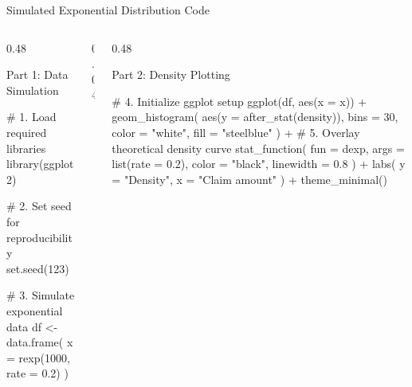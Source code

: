 \documentclass[
  ignorenonframetext,
  aspectratio=169,
]{beamer}
\newenvironment{Shaded}{\begin{snugshade}}{\end{snugshade}}
\newcommand{\AttributeTok}[1]{\textcolor[rgb]{0.40,0.45,0.13}{#1}}
\newcommand{\CommentTok}[1]{\textcolor[rgb]{0.37,0.37,0.37}{#1}}
\newcommand{\DecValTok}[1]{\textcolor[rgb]{0.68,0.00,0.00}{#1}}
\newcommand{\FloatTok}[1]{\textcolor[rgb]{0.68,0.00,0.00}{#1}}
\newcommand{\FunctionTok}[1]{\textcolor[rgb]{0.28,0.35,0.67}{#1}}
\newcommand{\NormalTok}[1]{\textcolor[rgb]{0.00,0.23,0.31}{#1}}
\newcommand{\OtherTok}[1]{\textcolor[rgb]{0.00,0.23,0.31}{#1}}
\newcommand{\SpecialCharTok}[1]{\textcolor[rgb]{0.37,0.37,0.37}{#1}}
\newcommand{\StringTok}[1]{\textcolor[rgb]{0.13,0.47,0.30}{#1}}
\begin{document}
\begin{frame}[fragile]{Simulated Exponential Distribution Code}
\protect{}\label{simulated-exponential-distribution-code}
\begin{columns}[T]
\begin{column}{0.48\linewidth}
\begin{block}{Part 1: Data Simulation}
\protect{}\label{part-1-data-simulation}
\begin{Shaded}
\begin{Highlighting}[]
\CommentTok{\# 1. Load required libraries}
\FunctionTok{library}\NormalTok{(ggplot2)}

\CommentTok{\# 2. Set seed for reproducibility}
\FunctionTok{set.seed}\NormalTok{(}\DecValTok{123}\NormalTok{)}

\CommentTok{\# 3. Simulate exponential data}
\NormalTok{df }\OtherTok{\textless{}{-}} \FunctionTok{data.frame}\NormalTok{(}
  \AttributeTok{x =} \FunctionTok{rexp}\NormalTok{(}\DecValTok{1000}\NormalTok{, }\AttributeTok{rate =} \FloatTok{0.2}\NormalTok{)}
\NormalTok{)}
\end{Highlighting}
\end{Shaded}
\end{block}
\end{column}

\begin{column}{0.04\linewidth}
\end{column}

\begin{column}{0.48\linewidth}
\begin{block}{Part 2: Density Plotting}
\protect{}\label{part-2-density-plotting}
\begin{Shaded}
\begin{Highlighting}[]
\CommentTok{\# 4. Initialize ggplot setup}
\FunctionTok{ggplot}\NormalTok{(df, }\FunctionTok{aes}\NormalTok{(}\AttributeTok{x =}\NormalTok{ x)) }\SpecialCharTok{+}
  \FunctionTok{geom\_histogram}\NormalTok{(}
    \FunctionTok{aes}\NormalTok{(}\AttributeTok{y =} \FunctionTok{after\_stat}\NormalTok{(density)), }
    \AttributeTok{bins =} \DecValTok{30}\NormalTok{, }
    \AttributeTok{color =} \StringTok{"white"}\NormalTok{, }
    \AttributeTok{fill =} \StringTok{"steelblue"}
\NormalTok{  ) }\SpecialCharTok{+}
  \CommentTok{\# 5. Overlay theoretical density curve}
  \FunctionTok{stat\_function}\NormalTok{(}
    \AttributeTok{fun =}\NormalTok{ dexp, }
    \AttributeTok{args =} \FunctionTok{list}\NormalTok{(}\AttributeTok{rate =} \FloatTok{0.2}\NormalTok{), }
    \AttributeTok{color =} \StringTok{"black"}\NormalTok{, }
    \AttributeTok{linewidth =} \FloatTok{0.8}
\NormalTok{  ) }\SpecialCharTok{+}
  \FunctionTok{labs}\NormalTok{(}
    \AttributeTok{y =} \StringTok{"Density"}\NormalTok{, }
    \AttributeTok{x =} \StringTok{"Claim amount"}
\NormalTok{  ) }\SpecialCharTok{+}
  \FunctionTok{theme\_minimal}\NormalTok{()}
\end{Highlighting}
\end{Shaded}
\end{block}
\end{column}
\end{columns}
\end{frame}
\end{document}
